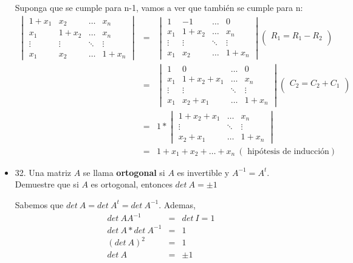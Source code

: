 \documentclass[12pt]{article}
\theoremstyle{plain}
\theoremstyle{definition}
\begin{document}
\begin{itemize}
        Suponga que se cumple para n-1, vamos a ver que también se cumple para n:
        \begin{eqnarray*}
        \begin{vmatrix}
          1+x_1 & x_2 & \dots & x_n\\
          x_1 & 1+x_2 & \dots & x_n\\
          \vdots & \vdots & \ddots & \vdots\\
          x_1 &  x_2 & \dots & 1+x_n
        \end{vmatrix}&=&\begin{vmatrix}
          1 & -1 & \dots & 0\\
          x_1 & 1+x_2 & \dots & x_n\\
          \vdots & \vdots & \ddots & \vdots\\
          x_1 &  x_2 & \dots & 1+x_n
        \end{vmatrix} \begin{pmatrix}
          R_1=R_1-R_2\\ 
         \end{pmatrix}\\
        &=&\begin{vmatrix}
          1 & 0 & \dots & 0\\
          x_1 & 1+x_2+x_1 & \dots & x_n\\
          \vdots & \vdots & \ddots & \vdots\\
          x_1 &  x_2+x_1 & \dots & 1+x_n
        \end{vmatrix} \begin{pmatrix}
          C_2=C_2+C_1\\ 
         \end{pmatrix}\\
         &=&1*\begin{vmatrix}
        1+x_2+x_1 & \dots & x_n\\
          \vdots & \ddots & \vdots\\
           x_2+x_1 & \dots & 1+x_n
        \end{vmatrix}\\
        &=& 1+x_1+x_2+\dots+x_n \ (\text{ hipótesis de inducción})
        \end{eqnarray*}
    \item 32. Una matriz $A$ se llama \textbf{ortogonal} si $A$ es invertible y $A^{-1}=A^t$. Demuestre que si $A$ es ortogonal, entonces $det \ A=\pm 1$
    
    Sabemos que $det\ A= det \ A^t= det \ A^{-1}$. Ademas, 
    \begin{eqnarray*}
    det \ AA^{-1}&=&det \ I=1\\
    det\ A * det \ A^{-1}&=&1\\
    (det\ A)^2&=&1\\
    det\ A&=&\pm1
    \end{eqnarray*}
    

\end{itemize}
\end{document}
